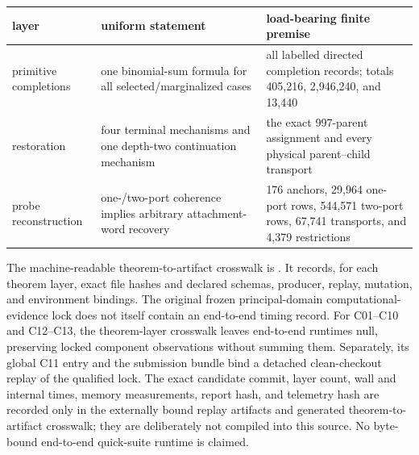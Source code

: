 \begin{center}
\small
\begin{tabular}{L{.27\linewidth}L{.27\linewidth}L{.36\linewidth}}
\toprule
layer & uniform statement & load-bearing finite premise\\
\midrule
primitive completions
& one binomial-sum formula for all selected/marginalized cases
& all labelled directed completion records; totals 405,216, 2,946,240,
  and 13,440\\
restoration
& four terminal mechanisms and one depth-two continuation mechanism
& the exact 997-parent assignment and every physical parent--child transport\\
probe reconstruction
& one-/two-port coherence implies arbitrary attachment-word recovery
& 176 anchors, 29,964 one-port rows, 544,571 two-port rows, 67,741
  transports, and 4,379 restrictions\\
\bottomrule
\end{tabular}
\end{center}

The machine-readable theorem-to-artifact crosswalk is
.
It records, for each theorem layer, exact file hashes and declared schemas,
producer, replay, mutation, and environment bindings.  The original frozen
principal-domain computational-evidence lock does not itself contain an
end-to-end timing record.  For C01--C10 and C12--C13, the theorem-layer
crosswalk leaves end-to-end runtimes null, preserving locked component
observations without summing them.  Separately, its global C11 entry and the
submission bundle bind a detached clean-checkout replay of the qualified lock.
The exact candidate commit, layer count, wall and internal times, memory
measurements, report hash, and telemetry hash are recorded only in the
externally bound replay artifacts and generated theorem-to-artifact crosswalk;
they are deliberately not compiled into this source.  No byte-bound
end-to-end quick-suite runtime is claimed.
